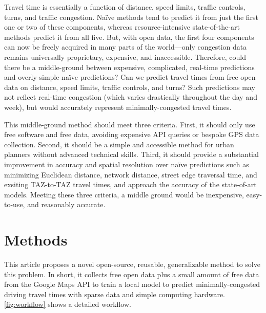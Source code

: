 \documentclass[12pt,letterpaper]{article} %
\begin{document}
Travel time is essentially a function of distance, speed limits, traffic controls, turns, and traffic congestion. Naïve methods tend to predict it from just the first one or two of these components, whereas resource-intensive state-of-the-art methods predict it from all five. But, with open data, the first four components can now be freely acquired in many parts of the world---only congestion data remains universally proprietary, expensive, and inaccessible. Therefore, could there be a middle-ground between expensive, complicated, real-time predictions and overly-simple naïve predictions? Can we predict travel times from free open data on distance, speed limits, traffic controls, and turns? Such predictions may not reflect real-time congestion (which varies drastically throughout the day and week), but would accurately represent minimally-congested travel times.

This middle-ground method should meet three criteria. First, it should only use free software and free data, avoiding expensive API queries or bespoke GPS data collection. Second, it should be a simple and accessible method for urban planners without advanced technical skills. Third, it should provide a substantial improvement in accuracy and spatial resolution over naïve predictions such as minimizing Euclidean distance, network distance, street edge traversal time, and exsiting TAZ-to-TAZ travel times, and approach the accuracy of the state-of-art models. Meeting these three criteria, a middle ground would be inexpensive, easy-to-use, and reasonably accurate.

\section{Methods}

This article proposes a novel open-source, reusable, generalizable method to solve this problem. In short, it collects free open data plus a small amount of free data from the Google Maps API to train a local model to predict minimally-congested driving travel times with sparse data and simple computing hardware. \autoref{fig:workflow} shows a detailed workflow.
\end{document}
